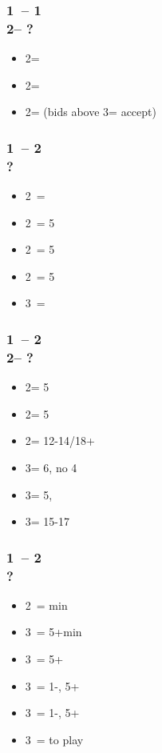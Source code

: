 \documentclass[12pt, a4paper]{article}
\begin{document}
\subsubsection*{1\clubs\ -- 1\spades \\ 
                2\clubs -- ?}
\begin{itemize}
    \item 2\diams = \gf
    \item 2\hearts = \inv \nat
    \item 2\nt = \inv (bids above 3\clubs = accept)
\end{itemize}

\subsubsection*{1\clubs\ -- 2\clubs \\ ?}
\begin{itemize}
    \item 2\diams\ = \bal
    \item 2\hearts\ = 5\hearts\ \unbal
    \item 2\spades\ = 5\spades\ \unbal
    \item 2\nt\ = 5\diams\ \unbal
    \item 3\clubs\ = \clubs\ \unbal
\end{itemize}

\subsubsection*{1\clubs\ -- 2\clubs \\
                2\diams -- ?}
\begin{itemize}
    \item 2\hearts = 5\hearts\ \unbal
    \item 2\spades = 5\spades\ \unbal
    \item 2\nt = 12-14/18+ \bal
    \item 3\clubs = 6\clubs, no 4\major
    \item 3\diams = 5\diams, \gf
    \item 3\nt = 15-17 \bal
\end{itemize}

\subsubsection*{1\clubs\ -- 2\spades \\ ?}
\begin{itemize}
    \item 2\nt\ = \bal min
    \item 3\clubs\ = 5+\clubs min
    \item 3\diams\ = 5+\clubs\ \gf
    \item 3\hearts\ = 1-\hearts, 5+\clubs\ \gf
    \item 3\spades\ = 1-\spades, 5+\clubs\ \gf
    \item 3\nt\ = to play
\end{itemize}

\end{document}
